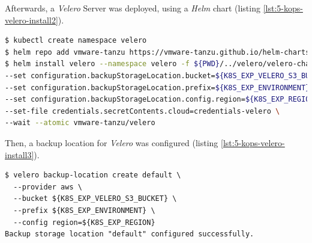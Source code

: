 Afterwards, a \textit{Velero} Server was deployed, using a \textit{Helm} chart (listing \ref{lst:5-kops-velero-install2}).

\begin{lstlisting}[basicstyle=\scriptsize,xleftmargin=0cm,label=lst:5-kops-velero-install2,caption={Deploying a vs \textit{Helm} chart},captionpos=b,language=Bash]
$ kubectl create namespace velero
$ helm repo add vmware-tanzu https://vmware-tanzu.github.io/helm-charts
$ helm install velero --namespace velero -f ${PWD}/../velero/velero-chart-values.yaml \
--set configuration.backupStorageLocation.bucket=${K8S_EXP_VELERO_S3_BUCKET} \
--set configuration.backupStorageLocation.prefix=${K8S_EXP_ENVIRONMENT} \
--set configuration.backupStorageLocation.config.region=${K8S_EXP_REGION} \
--set-file credentials.secretContents.cloud=credentials-velero \
--wait --atomic vmware-tanzu/velero
\end{lstlisting}

Then, a backup location for \textit{Velero} was configured (listing \ref{lst:5-kops-velero-install3}).
\begin{lstlisting}[basicstyle=\scriptsize,xleftmargin=0cm,label=lst:5-kops-velero-install3,caption={Choosing a backup storage location for \textit{Velero}}]
$ velero backup-location create default \
  --provider aws \
  --bucket ${K8S_EXP_VELERO_S3_BUCKET} \
  --prefix ${K8S_EXP_ENVIRONMENT} \
  --config region=${K8S_EXP_REGION}
Backup storage location "default" configured successfully.
\end{lstlisting}

